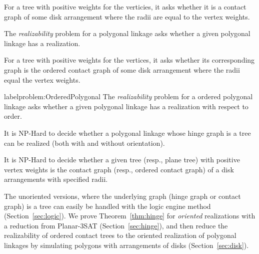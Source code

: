 \begin{prob}\label{problem:UnorderedTree}
For a tree with positive weights for the verticies, it asks whether it is a contact graph of some 
disk arrangement where the radii are equal to the vertex weights.
\end{prob}
\begin{prob}\label{problem:UnorderedPolygonal}
The \emph{realizability} problem for a polygonal linkage asks whether a given polygonal linkage has 
a realization.
\end{prob}
\begin{prob}\label{problem:OrderedTree}
For a tree with positive weights for the vertices, it asks whether its corresponding graph is the 
ordered contact graph of some disk arrangement where the radii equal the vertex weights.
\end{prob}
\begin{prob}label{problem:OrderedPolygonal}
The \emph{realizability} problem for a ordered polygonal linkage asks whether a given polygonal 
linkage has a realization with respect to order.
\end{prob}

\begin{thm}\label{thm:hinge}
It is NP-Hard to decide whether a polygonal linkage whose hinge graph is a tree can be realized 
(both with and without orientation).
\end{thm}

\begin{thm}\label{thm:disk}
It is NP-Hard to decide whether a given tree (resp., plane tree) with positive vertex weights
is the contact graph (resp., ordered contact graph) of a disk arrangements with specified radii.
\end{thm}

The unoriented versions, where the underlying graph (hinge graph or contact graph) is a tree can 
easily be handled with the logic engine method (Section~\ref{sec:logic}). We prove 
Theorem~\ref{thm:hinge} for \emph{oriented} realizations with a reduction from {\sc Planar-3SAT} 
(Section~\ref{sec:hinge}), and then reduce the realizability of ordered contact trees to the 
oriented realization of polygonal linkages by simulating polygons with arrangements of disks 
(Section~\ref{sec:disk}).


